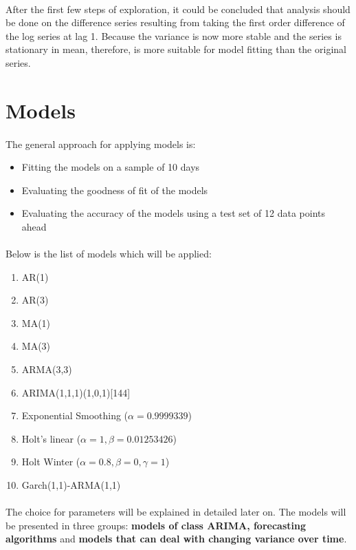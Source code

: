 \documentclass[12pt]{article}
\begin{document}
\paragraph{}
After the first few steps of exploration, it could be concluded that analysis should be done on the difference series resulting from taking the first order difference of the log series at lag 1. Because the variance is now more stable and the  series is stationary in mean, therefore, is more suitable for model fitting than the original series.
 
\section{Models}
\paragraph{}
The general approach for applying models is: 
\begin{itemize}
  \item Fitting the models on a sample of 10 days 
  \item Evaluating the goodness of fit of the models
  \item Evaluating the accuracy of the models using a test set of 12 data points ahead
\end{itemize}
\paragraph{}
Below is the list of models which will be applied:
\begin{enumerate}
  \item AR(1)
  \item AR(3)
  \item MA(1)
  \item MA(3)
  \item ARMA(3,3)
  \item ARIMA(1,1,1)(1,0,1)[144]
  \item Exponential Smoothing ($\alpha=0.9999339$)
  \item Holt's linear ($\alpha=1,\beta=0.01253426$)
  \item Holt Winter ($\alpha=0.8,\beta=0,\gamma=1$)
  \item Garch(1,1)-ARMA(1,1)
\end{enumerate}

\paragraph{}
The choice for parameters will be explained in detailed later on. The models will be presented in three groups: \textbf{models of class ARIMA, forecasting algorithms} and \textbf{models that can deal with changing variance over time}.
\end{document}
